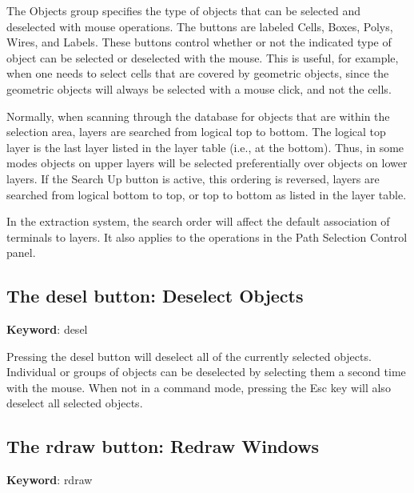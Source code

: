 The {\cb Objects} group specifies the type of objects that can be
selected and deselected with mouse operations.  The buttons are
labeled {\cb Cells}, {\cb Boxes}, {\cb Polys}, {\cb Wires}, and {\cb
Labels}.  These buttons control whether or not the indicated type of
object can be selected or deselected with the mouse.  This is useful,
for example, when one needs to select cells that are covered by
geometric objects, since the geometric objects will always be selected
with a mouse click, and not the cells.

Normally, when scanning through the database for objects that are
within the selection area, layers are searched from logical top to
bottom.  The logical top layer is the last layer listed in the layer
table (i.e., at the bottom).  Thus, in some modes objects on upper
layers will be selected preferentially over objects on lower layers. 
If the {\cb Search Up} button is active, this ordering is reversed,
layers are searched from logical bottom to top, or top to bottom as
listed in the layer table.

In the extraction system, the search order will affect the default
association of terminals to layers.  It also applies to the operations
in the {\cb Path Selection Control} panel.


\subsection{The {\cb desel} button: Deselect Objects}

{\bf Keyword}: {\vt desel}

Pressing the {\cb desel} button will deselect all of the currently
selected objects.  Individual or groups of objects can be deselected
by selecting them a second time with the mouse.  When not in a command
mode, pressing the {\kb Esc} key will also deselect all selected
objects.


\subsection{The {\cb rdraw} button: Redraw Windows}

{\bf Keyword}: {\vt rdraw}

